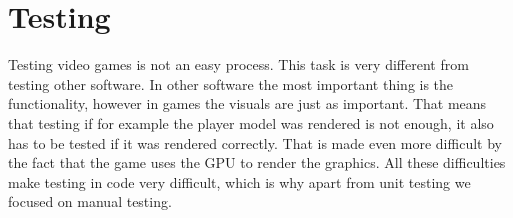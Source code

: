 \chapter{Testing} \label{ch:testing}
Testing video games is not an easy process.
This task is very different from testing other software.
In other software the most important thing is the functionality, however in games the visuals are just as important.
That means that testing if for example the player model was rendered is not enough, it also has to be tested if it was rendered correctly.
That is made even more difficult by the fact that the game uses the GPU to render the graphics.
All these difficulties make testing in code very difficult, which is why apart from unit testing we focused on manual testing.


